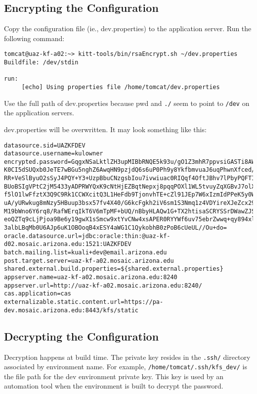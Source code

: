 \documentclass[12pt,notitlepage]{article}
\begin{document}
\subsection{Encrypting the Configuration}
Copy the configuration file (ie., dev.properties) to the application server. Run the following command:

\begin{lstlisting}
tomcat@uaz-kf-a02:~> kitt-tools/bin/rsaEncrypt.sh ~/dev.properties 
Buildfile: /dev/stdin

run:
     [echo] Using properties file /home/tomcat/dev.properties
\end{lstlisting}

Use the full path of dev.properties because pwd and \verb|./| seem to point to \verb|/dev| on the application servers.

dev.properties will be overwritten. It may look something like this:

\begin{lstlisting}
datasource.sid=UAZKFDEV
datasource.username=kulowner
encrypted.password=GqgxNSaLktlZH3upMIBbRNQE5k93u/gO1Z3mhR7ppvsiGASTi8AWUCrsafSFt
K0CI5dSUQxb0JeTE7wBGu5nghZ6AwqHN9pzjdQ6s6uP0Ph9y8YkfbmvuaJ6uqPhwnXfced/sYt6YhIT9
RR+VeSlByuO2sSyJ4PQY+Y3+UzpBbuCNzgsbIou7ivwiuac0RIQqf4OftJBhv7lPbyPQFTIP0vHAKUoE
BUoBSIgVPtC2jM5433yADPRWYQxK9cNtHjEZBqtNepxj8pqqPOXl1WL5tvuyZqXGBvJ7olX3+CkEvjcK
f5lO1lwFfztX3Q9C9Rk1CCWXcitQ3L1HeFdb9TjonvhTE+cZl91JEp7W6xIzmIdPPeK5y0WtFvmEdOgH
uA/yURwkug8mNzy5HBuup3bsx57fv4X40/G6kcFgkh2iV6sm1S3Nmq1z4VDYireXJeZcx29i5mkRYWLq
M19bWno6Y6rq8/RafWErqIkT6V6mTpMF+bUQ/nBbyHLAQw1G+TX2htisaSCRYSSrDWawZJSLMEENBc1j
eoQZTq9cLjPjoa9Be6y19gwX1sSmcw9xtYvCNw4xsAPER0RYYWf6uv75ebrZwwq+qy894xlf03n/mi7M
3albLBqMb0U6AJp6uK1OBOoqB4xESY4aWG1C1QykobhB0zPoB6cUeUL//Ou+do=
oracle.datasource.url=jdbc:oracle:thin:@uaz-kf-d02.mosaic.arizona.edu:1521:UAZKFDEV
batch.mailing.list=kuali+dev@email.arizona.edu
post.target.server=uaz-kf-a02.mosaic.arizona.edu
shared.external.build.properties=${shared.external.properties}
appserver.name=uaz-kf-a02.mosaic.arizona.edu:8240
appserver.url=http://uaz-kf-a02.mosaic.arizona.edu:8240/
cas.application=cas
externalizable.static.content.url=https://pa-dev.mosaic.arizona.edu:8443/kfs/static

\end{lstlisting}

\subsection{Decrypting the Configuration}
Decryption happens at build time. The private key resides in the \verb|.ssh/| directory
associated by environment name. For example, \verb|/home/tomcat/.ssh/kfs_dev/| is the file
path for the dev environment private key. This key is used by an automation tool when the 
environment is built to decrypt the password.
\end{document}
